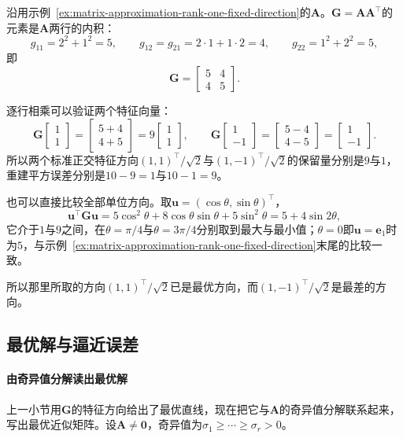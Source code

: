 \begin{example}[比较两个特征方向]
\label{ex:matrix-approximation-rank-one-eigen-directions}
沿用示例~\ref{ex:matrix-approximation-rank-one-fixed-direction}的$\bm A$。$\bm G=\bm A\bm A^\top$的元素是$\bm A$两行的内积：
\[
 g_{11}=2^2+1^2=5,\qquad g_{12}=g_{21}=2\cdot1+1\cdot2=4,\qquad g_{22}=1^2+2^2=5,
\]
即
\[
 \bm G=\begin{bmatrix}5&4\\4&5\end{bmatrix}.
\]

逐行相乘可以验证两个特征向量：
\[
 \bm G\begin{bmatrix}1\\1\end{bmatrix}=\begin{bmatrix}5+4\\4+5\end{bmatrix}=9\begin{bmatrix}1\\1\end{bmatrix},\qquad
 \bm G\begin{bmatrix}1\\-1\end{bmatrix}=\begin{bmatrix}5-4\\4-5\end{bmatrix}=\begin{bmatrix}1\\-1\end{bmatrix}.
\]
所以两个标准正交特征方向$(1,1)^\top/\sqrt2$与$(1,-1)^\top/\sqrt2$的保留量分别是$9$与$1$，重建平方误差分别是$10-9=1$与$10-1=9$。

也可以直接比较全部单位方向。取$\bm u=(\cos\theta,\sin\theta)^\top$，
\[
 \bm u^\top\bm G\bm u=5\cos^2\theta+8\cos\theta\sin\theta+5\sin^2\theta=5+4\sin2\theta ,
\]
它介于$1$与$9$之间，在$\theta=\pi/4$与$\theta=3\pi/4$分别取到最大与最小值；$\theta=0$即$\bm u=\bm e_1$时为$5$，与示例~\ref{ex:matrix-approximation-rank-one-fixed-direction}末尾的比较一致。

所以那里所取的方向$(1,1)^\top/\sqrt2$已是最优方向，而$(1,-1)^\top/\sqrt2$是最差的方向。
\end{example}

\subsection{最优解与逼近误差}
\label{sec:matrix-approximation-rank-one-solution}

\paragraph{由奇异值分解读出最优解}
上一小节用$\bm G$的特征方向给出了最优直线，现在把它与$\bm A$的奇异值分解联系起来，写出最优近似矩阵。设$\bm A\neq\bm0$，奇异值为$\sigma_1\geq\cdots\geq\sigma_r>0$。

